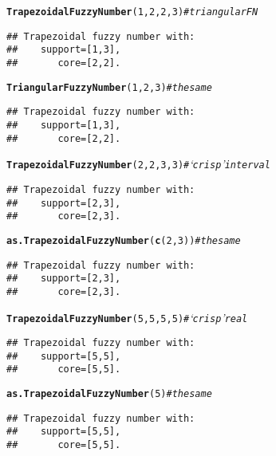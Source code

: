\documentclass[11pt]{article}\usepackage[]{graphicx}\usepackage[]{color}
\makeatletter
\newcommand{\hlnum}[1]{\textcolor[rgb]{0.686,0.059,0.569}{#1}}%
\newcommand{\hlcom}[1]{\textcolor[rgb]{0.678,0.584,0.686}{\textit{#1}}}%
\newcommand{\hlstd}[1]{\textcolor[rgb]{0.345,0.345,0.345}{#1}}%
\newcommand{\hlkwd}[1]{\textcolor[rgb]{0.737,0.353,0.396}{\textbf{#1}}}%
\newenvironment{kframe}{%
 \def\at@end@of@kframe{}%
 \ifinner\ifhmode%
  \def\at@end@of@kframe{\end{minipage}}%
  \begin{minipage}{\columnwidth}%
 \fi\fi%
 \def\FrameCommand##1{\hskip\@totalleftmargin \hskip-\fboxsep
 \colorbox{shadecolor}{##1}\hskip-\fboxsep
     \hskip-\linewidth \hskip-\@totalleftmargin \hskip\columnwidth}%
 \MakeFramed {\advance\hsize-\width
   \@totalleftmargin\z@ \linewidth\hsize
   \@setminipage}}%
 {\par\unskip\endMakeFramed%
 \at@end@of@kframe}
\newenvironment{knitrout}{}{} %
\makeatother
\begin{document}
\begin{knitrout}\small
{}\color{fgcolor}\begin{kframe}
\begin{alltt}
\hlkwd{TrapezoidalFuzzyNumber}\hlstd{(}\hlnum{1}\hlstd{,}\hlnum{2}\hlstd{,}\hlnum{2}\hlstd{,}\hlnum{3}\hlstd{)}   \hlcom{# triangular FN}
\end{alltt}
\begin{verbatim}
## Trapezoidal fuzzy number with:
##    support=[1,3],
##       core=[2,2].
\end{verbatim}
\begin{alltt}
\hlkwd{TriangularFuzzyNumber}\hlstd{(}\hlnum{1}\hlstd{,}\hlnum{2}\hlstd{,}\hlnum{3}\hlstd{)}      \hlcom{# the same}
\end{alltt}
\begin{verbatim}
## Trapezoidal fuzzy number with:
##    support=[1,3],
##       core=[2,2].
\end{verbatim}
\begin{alltt}
\hlkwd{TrapezoidalFuzzyNumber}\hlstd{(}\hlnum{2}\hlstd{,}\hlnum{2}\hlstd{,}\hlnum{3}\hlstd{,}\hlnum{3}\hlstd{)}   \hlcom{# `crisp' interval}
\end{alltt}
\begin{verbatim}
## Trapezoidal fuzzy number with:
##    support=[2,3],
##       core=[2,3].
\end{verbatim}
\begin{alltt}
\hlkwd{as.TrapezoidalFuzzyNumber}\hlstd{(}\hlkwd{c}\hlstd{(}\hlnum{2}\hlstd{,}\hlnum{3}\hlstd{))} \hlcom{# the same}
\end{alltt}
\begin{verbatim}
## Trapezoidal fuzzy number with:
##    support=[2,3],
##       core=[2,3].
\end{verbatim}
\begin{alltt}
\hlkwd{TrapezoidalFuzzyNumber}\hlstd{(}\hlnum{5}\hlstd{,}\hlnum{5}\hlstd{,}\hlnum{5}\hlstd{,}\hlnum{5}\hlstd{)}   \hlcom{# `crisp' real}
\end{alltt}
\begin{verbatim}
## Trapezoidal fuzzy number with:
##    support=[5,5],
##       core=[5,5].
\end{verbatim}
\begin{alltt}
\hlkwd{as.TrapezoidalFuzzyNumber}\hlstd{(}\hlnum{5}\hlstd{)}      \hlcom{# the same}
\end{alltt}
\begin{verbatim}
## Trapezoidal fuzzy number with:
##    support=[5,5],
##       core=[5,5].
\end{verbatim}
\end{kframe}
\end{knitrout}
\end{document}

